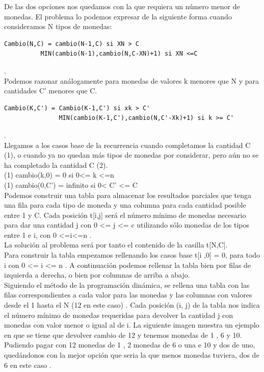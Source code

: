 	 De las dos opciones nos quedamos con la que requiera un número menor de monedas. El problema lo podemos expresar de la siguiente forma cuando consideramos N tipos de monedas: \\
	 
	\lstset{language=C}
	\begin{lstlisting}[frame=single]
Cambio(N,C) = cambio(N-1,C) si XN > C
	      MIN(cambio(N-1),cambio(N,C-XN)+1) si XN <=C
	\end{lstlisting} 
	 	
	.\\
	 Podemos razonar análogamente para monedas de valores k menores que N y para cantidades C’ menores que C. \\
	 
	 \lstset{language=C}
	\begin{lstlisting}[frame=single]
Cambio(K,C') = Cambio(K-1,C') si xk > C'
               MIN(cambio(K-1,C'),cambio(N,C'-Xk)+1) si k >= C'
	\end{lstlisting} 
	
	.\\
	
	Llegamos a los casos base de la recurrencia cuando completamos la cantidad C (1), o cuando ya no quedan más tipos de monedas por considerar, pero aún no se ha completado la cantidad C (2).\\
	
	(1)	cambio(k,0) = 0 si 0<= k <=n  \\
	(1)	cambio(0,C’) = infinito si 0< C’ <= C \\
	
	
	Podemos construir una tabla para almacenar los resultados parciales que tenga una fila para cada tipo de moneda y una columna para cada cantidad posible entre 1 y C. Cada posición t[i,j] será el número mínimo de monedas necesario para dar una cantidad j con 0 <= j <= c utilizando sólo monedas de los tipos entre 1 e i, con 0 <=i<=n .\\
	
	La solución al problema será por tanto el contenido de la casilla t[N,C].\\
	
	Para construir la tabla empezamos rellenando los casos base t[i ,0] = 0, para todo i con 0 <= i  <=  n . A continuación podemos rellenar la tabla bien por filas de izquierda a derecha, o bien por columnas de arriba a abajo. \\
	
	Siguiendo el método de la programación dinámica, se rellena una tabla con las filas correspondientes a cada valor para las monedas y las columnas con valores desde el 1 hasta el N (12 en este caso) . Cada posición (i, j) de la tabla nos indica el número mínimo de monedas requeridas para devolver la cantidad j con monedas con valor menor o igual al de i. La siguiente imagen muestra un ejemplo en que se tiene que devolver cambio de 12 y tenemos monedas de 1 , 6 y 10. Pudiendo pagar con 12 monedas de 1 , 2 monedas de 6 o una e 10 y dos de uno, quedándonos con la mejor opción que seria la que menos monedas tuviera, dos de 6 en este caso .   \\
	
